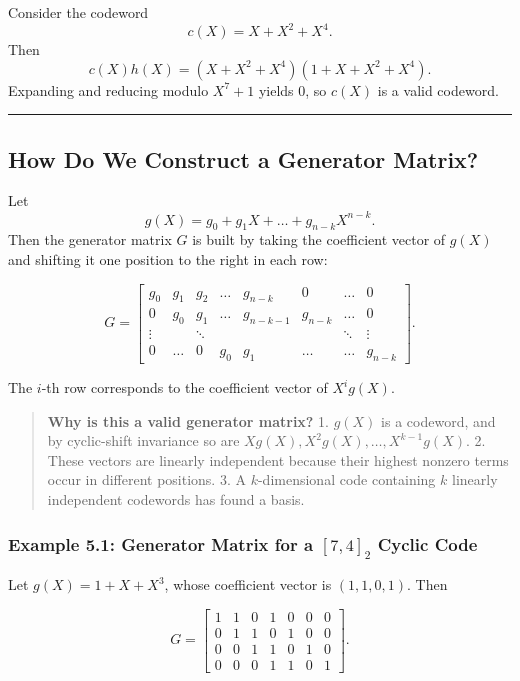 \documentclass[
]{article}
\begin{document}
Consider the codeword \[c(X)=X+X^2+X^4.\] Then
\[c(X)h(X) = (X+X^2+X^4)(1+X+X^2+X^4).\] Expanding and reducing modulo
\(X^7+1\) yields 0, so \(c(X)\) is a valid codeword.

\begin{center}\rule{0.5\linewidth}{0.5pt}\end{center}

\subsection{How Do We Construct a Generator
Matrix?}\label{how-do-we-construct-a-generator-matrix}

Let \[g(X)=g_0+g_1X+\dots+g_{n-k}X^{n-k}.\] Then the generator matrix
\(G\) is built by taking the coefficient vector of \(g(X)\) and shifting
it one position to the right in each row:

\[G = \begin{bmatrix}
g_0 & g_1 & g_2 & \dots & g_{n-k} & 0 & \dots & 0 \\
0 & g_0 & g_1 & \dots & g_{n-k-1} & g_{n-k} & \dots & 0 \\
\vdots & & \ddots & & & & \ddots & \vdots \\
0 & \dots & 0 & g_0 & g_1 & \dots & \dots & g_{n-k}
\end{bmatrix}.\]

The \(i\)-th row corresponds to the coefficient vector of \(X^i g(X)\).

\begin{quote}
\textbf{Why is this a valid generator matrix?} 1. \(g(X)\) is a
codeword, and by cyclic-shift invariance so are
\(Xg(X),X^2g(X),\dots,X^{k-1}g(X)\). 2. These vectors are linearly
independent because their highest nonzero terms occur in different
positions. 3. A \(k\)-dimensional code containing \(k\) linearly
independent codewords has found a basis.
\end{quote}

\subsubsection{\texorpdfstring{Example 5.1: Generator Matrix for a
\([7,4]_2\) Cyclic
Code}{Example 5.1: Generator Matrix for a {[}7,4{]}\_2 Cyclic Code}}\label{example-5.1-generator-matrix-for-a-74_2-cyclic-code}

Let \(g(X)=1+X+X^3\), whose coefficient vector is \((1,1,0,1)\). Then

\[G = \begin{bmatrix}
1 & 1 & 0 & 1 & 0 & 0 & 0 \\
0 & 1 & 1 & 0 & 1 & 0 & 0 \\
0 & 0 & 1 & 1 & 0 & 1 & 0 \\
0 & 0 & 0 & 1 & 1 & 0 & 1
\end{bmatrix}.\]
\end{document}
